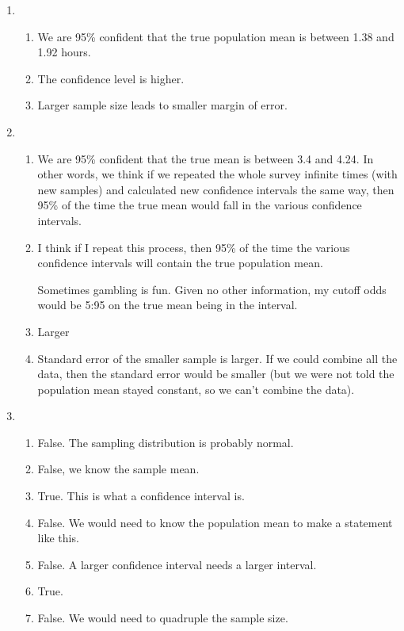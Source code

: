 \documentclass[12pt,letterpaper]{article}
\begin{document}
\begin{enumerate}
\item \begin{enumerate}
\item We are 95\% confident that the true population mean is between 1.38 and 1.92 hours.
\item The confidence level is higher.
\item Larger sample size leads to smaller margin of error.
\end{enumerate}

\item \begin{enumerate}
\item We are 95\% confident that the true mean is between 3.4 and 4.24. In other words, we think if we repeated the whole survey infinite times (with new samples) and calculated new confidence intervals the same way, then 95\% of the time the true mean would fall in the various confidence intervals.
\item I think if I repeat this process, then 95\% of the time the various confidence intervals will contain the true population mean. 

Sometimes gambling is fun. Given no other information, my cutoff odds would be 5:95 on the true mean being in the interval.
\item Larger
\item Standard error of the smaller sample is larger. If we could combine all the data, then the standard error would be smaller (but we were not told the population mean stayed constant, so we can't combine the data).
\end{enumerate}

\item \begin{enumerate}
\item False. The sampling distribution is probably normal.
\item False, we know the sample mean.
\item True. This is what a confidence interval is.
\item False. We would need to know the population mean to make a statement like this.
\item False. A larger confidence interval needs a larger interval.
\item True.
\item False. We would need to quadruple the sample size.
\end{enumerate}



\end{enumerate}
\end{document}

